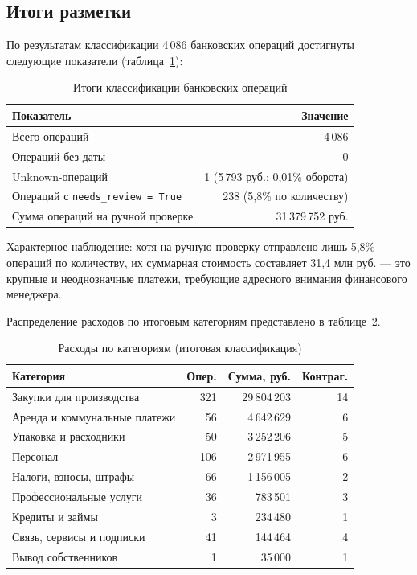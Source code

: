 \subsection{Итоги разметки}

По результатам классификации 4\,086 банковских операций достигнуты следующие показатели (таблица~\ref{tab:classification_results}):

\begin{table}[H]
\centering
\caption{Итоги классификации банковских операций}
\label{tab:classification_results}
\begin{tabular}{lr}
\toprule
\textbf{Показатель} & \textbf{Значение} \\
\midrule
Всего операций & 4\,086 \\
Операций без даты & 0 \\
Unknown-операций & 1 (5\,793 руб.; 0,01\% оборота) \\
Операций с \texttt{needs\_review = True} & 238 (5,8\% по количеству) \\
Сумма операций на ручной проверке & 31\,379\,752 руб. \\
\bottomrule
\end{tabular}
\end{table}

Характерное наблюдение: хотя на ручную проверку отправлено лишь 5,8\% операций по количеству, их суммарная стоимость составляет 31,4 млн руб. --- это крупные и неоднозначные платежи, требующие адресного внимания финансового менеджера.

Распределение расходов по итоговым категориям представлено в таблице~\ref{tab:category_breakdown}.

\begin{table}[H]
\centering
\caption{Расходы по категориям (итоговая классификация)}
\label{tab:category_breakdown}
\begin{tabular}{lrrr}
\toprule
\textbf{Категория} & \textbf{Опер.} & \textbf{Сумма, руб.} & \textbf{Контраг.} \\
\midrule
Закупки для производства & 321 & 29\,804\,203 & 14 \\
Аренда и коммунальные платежи & 56 & 4\,642\,629 & 6 \\
Упаковка и расходники & 50 & 3\,252\,206 & 5 \\
Персонал & 106 & 2\,971\,955 & 6 \\
Налоги, взносы, штрафы & 66 & 1\,156\,005 & 2 \\
Профессиональные услуги & 36 & 783\,501 & 3 \\
Кредиты и займы & 3 & 234\,480 & 1 \\
Связь, сервисы и подписки & 41 & 144\,464 & 4 \\
Вывод собственников & 1 & 35\,000 & 1 \\
\bottomrule
\end{tabular}
\end{table}

